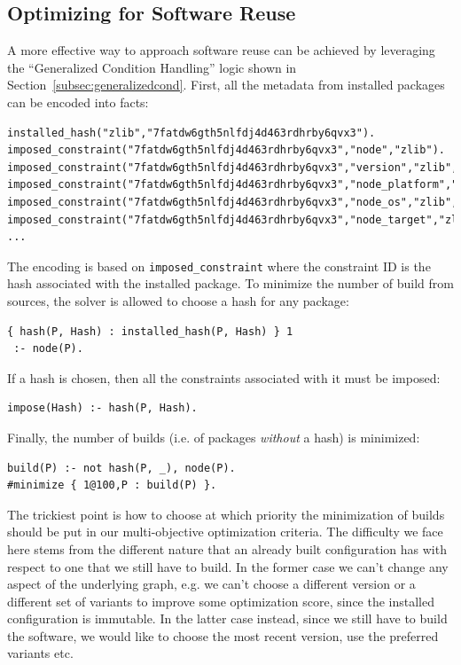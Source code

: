 \subsection{Optimizing for Software Reuse}
A more effective way to approach software reuse can be achieved by leveraging the ``Generalized Condition Handling'' logic shown in Section~\ref{subsec:generalizedcond}.
First, all the metadata from installed packages can be encoded into facts:
\begin{verbatim}
installed_hash("zlib","7fatdw6gth5nlfdj4d463rdhrby6qvx3").
imposed_constraint("7fatdw6gth5nlfdj4d463rdhrby6qvx3","node","zlib").
imposed_constraint("7fatdw6gth5nlfdj4d463rdhrby6qvx3","version","zlib","1.2.11").
imposed_constraint("7fatdw6gth5nlfdj4d463rdhrby6qvx3","node_platform","zlib","linux").
imposed_constraint("7fatdw6gth5nlfdj4d463rdhrby6qvx3","node_os","zlib","ubuntu20.04").
imposed_constraint("7fatdw6gth5nlfdj4d463rdhrby6qvx3","node_target","zlib","icelake").
...
\end{verbatim}
The encoding is based on \texttt{imposed\_constraint} where the constraint ID is the hash associated with the installed package.
To minimize the number of build from sources, the solver is allowed to choose a hash for any package:
\begin{verbatim}
{ hash(P, Hash) : installed_hash(P, Hash) } 1
 :- node(P).
\end{verbatim}
If a hash is chosen, then all the constraints associated with it must be imposed:
\begin{verbatim}
impose(Hash) :- hash(P, Hash).
\end{verbatim}
Finally, the number of builds (i.e. of packages \emph{without} a hash) is minimized:
\begin{verbatim}
build(P) :- not hash(P, _), node(P).
#minimize { 1@100,P : build(P) }.
\end{verbatim}

The trickiest point is how to choose at which priority the minimization of builds should be put in our multi-objective optimization criteria. The difficulty we face here stems from the different nature that an already built configuration has with respect to one that we still have to build. In the former case we can't change any aspect of the underlying graph, e.g. we can't choose a different version or a different set of variants to improve some optimization score, since the installed configuration is immutable. In the latter case instead, since we still have to build the software, we would like to choose the most recent version, use the preferred variants etc.

